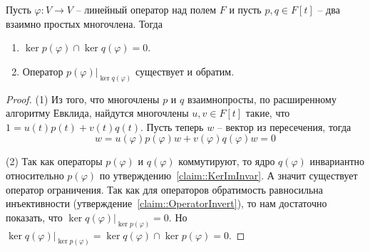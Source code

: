 \begin{claim}
\label{claim::CoprimeKernels}
Пусть $\varphi\colon V\to V$ -- линейный оператор над полем $F$ и пусть $p,q\in F[t]$ -- два взаимно простых многочлена.
Тогда 
\begin{enumerate}
\item $\ker p(\varphi)\cap \ker q(\varphi) = 0$.

\item Оператор $p(\varphi)|_{\ker q(\varphi)}$ существует и обратим.
\end{enumerate}
\end{claim}
\begin{proof}
(1)  Из того, что многочлены $p$ и $q$ взаимнопросты, по расширенному алгоритму Евклида, найдутся многочлены $u,v\in F[t]$ такие, что $1 = u(t)p(t) + v(t)q(t)$.
Пусть теперь $w$ -- вектор из пересечения, тогда
\[
w = u(\varphi) p(\varphi) w + v(\varphi) q(\varphi) w = 0
\]

(2) Так как операторы $p(\varphi)$ и $q(\varphi)$ коммутируют, то ядро $q(\varphi)$ инвариантно относительно $p(\varphi)$ по утверждению~\ref{claim::KerImInvar}.
А значит существует оператор ограничения.
Так как для операторов обратимость равносильна инъективности (утверждение~\ref{claim::OperatorInvert}), то нам достаточно показать, что $\ker q(\varphi)|_{\ker p(\varphi)} = 0$.
Но $\ker q(\varphi)|_{\ker p(\varphi)} = \ker q(\varphi) \cap \ker p(\varphi) = 0$.
\end{proof}



